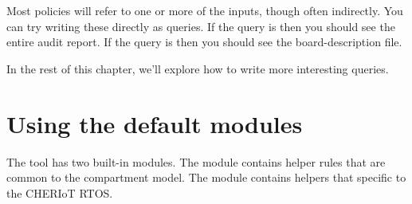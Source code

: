 Most policies will refer to one or more of the inputs, though often indirectly.
You can try writing these directly as queries.
If the query is  then you should see the entire audit report.
If the query is  then you should see the board-description file.

In the rest of this chapter, we'll explore how to write more interesting queries.

\section{Using the default  modules}

The  tool has two built-in modules.
The  module contains helper rules that are common to the compartment model.
The  module contains helpers that specific to the CHERIoT RTOS.

